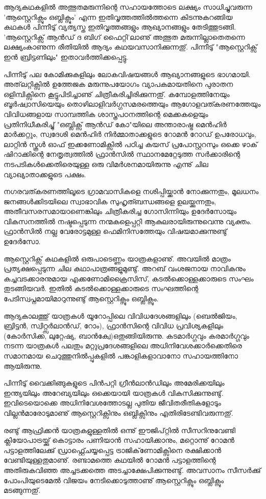 ആദ്യകഥകളില്‍ അത്ഭുതമരുന്നിന്റെ സഹായത്തോടെ ലക്ഷ്യം സാധിച്ചുവരുന്ന 'ആസ്റ്റെറിക്സും ഒബ്ലിക്സും' എന്ന 
ഇതിവൃത്തത്തില്‍ത്തന്നെ കിടന്നുകറങ്ങിയ കഥകള്‍ പിന്നീടു് വ്യത്യസ്ത ഇതിവൃത്തങ്ങളും ആഖ്യാനങ്ങളും തേടിത്തുടങ്ങി. 
'ആസ്റ്റെറിക്സ് ആന്‍ഡ് ദ ബിഗ് ഫൈറ്റി'ലാണു് അത്ഭുത മരുന്നില്ലാതെതന്നെ ലക്ഷ്യംകാണുന്ന രീതിയില്‍ ആദ്യം 
കഥയവസാനിക്കുന്നതു്. പിന്നീടു് "ആസ്റ്റെറിക്സ് ഇന്‍ ബ്രിട്ടണിലും" ഇതാവര്‍ത്തിക്കപ്പെട്ടു.

പിന്നീടു് പല കോമിക്കുകളിലും ലോകവിഷയങ്ങള്‍ ആഖ്യാനങ്ങളുടെ ഭാഗമായി. അത്‌ലറ്റിക്സില്‍ ഉത്തേജക 
മരുന്നുപയോഗം വ്യാപകമായതിനെ പുരാതന ഒളിമ്പിക്സിനെ കൂട്ടുപിടിച്ചാണു് ചിത്രീകരിച്ചിരിക്കുന്നതു്. കമ്പോളത്തിനേയും 
ബൂര്‍ഷ്വാസിയെയും തൊഴിലാളിവര്‍ഗ്ഗസമരത്തെയും ആഗോളവത്കരണത്തേയും വിവിധങ്ങളായ സാമ്പത്തിക 
ശാസ്ത്രപഠനത്തിന്റെ മെക്കകളെയും പ്രതിനിധീകരിച്ചു് "ഒബ്ലിക്സ് ആന്‍ഡ് കോ"യിലെ അന്താരാഷ്ട്ര മെന്‍ഹിര്‍ മാര്‍ക്കറ്റും, 
സ്വദേശി മെന്‍ഹിര്‍ നിര്‍മ്മാതാക്കളുടെ റോമന്‍ റോഡ് ഉപരോധവും, ലാറ്റിന്‍ സ്കൂള്‍ ഓഫ് ഇക്കണോമിക്സില്‍ പഠിച്ച കയസ് 
പ്രപോസ്റ്ററസും ഒക്കെ ഴാക് ഷിറാക്കിന്റെ നേതൃത്വത്തില്‍ ഫ്രാന്‍സില്‍ സ്ഥാനമേറ്റേടുത്ത സര്‍ക്കാരിന്റെ 
നടപടികള്‍ക്കെതിരെയുള്ള ഒരു വിമര്‍ശനമായിരുന്നു എന്നു് ചില വ്യാഖ്യാതാക്കളുടെ പക്ഷം.

നഗരവത്കരണത്തിലൂടെ ഗ്രാമവാസികളെ നശിപ്പിയ്ക്കാന്‍ നോക്കുന്നതും, മൂലധനം ജനങ്ങള്‍ക്കിടയിലെ സ്വാഭാവിക 
സുഹൃത്ബന്ധങ്ങളെ ഉലയ്ക്കുന്നതും, അതീവസരസമായാണെങ്കിലും ചിത്രീകരിച്ച ഗോസിന്നിയും ഉദേര്‍സോയും 
വികസനത്തില്‍ നഷ്ടപ്പെടുന്ന നന്മകളെപ്പറ്റി ആകുലരായിരുന്നുവെന്നു വ്യക്തം. ഫ്രാന്‍സില്‍ നല്ല വേരോട്ടമുള്ള 
ഫെമിനിസത്തേയും വിഷയമാക്കുന്നുണ്ടു് ഉദേര്‍സോ.

ആസ്റ്റെറിക്സ് കഥകളില്‍ ഒരുപാടെണ്ണം യാത്രകളാണു്. അവയില്‍ മാത്രം പ്രത്യക്ഷപ്പെടുന്ന ചില കഥാപാത്രങ്ങളുമുണ്ടു്. 
അറബ് വംശജനായ നാവികനും കച്ചവടക്കാരനുമായ എക്കണോമിക്രൈസിസ്, കടല്‍ക്കൊള്ളക്കാരുടെ സംഘം 
തുടങ്ങിയവര്‍. ഇതില്‍ കടല്‍ക്കൊള്ളക്കാരുടെ സംഘത്തിന്റെ പേടിസ്വപ്നമായിമാറുന്നുണ്ടു് ആസ്റ്റെറിക്സും ഒബ്ലിക്സും.

ആദ്യകാലത്തു് യാത്രകള്‍ യൂറോപ്പിലെ വിവിധദേശങ്ങളിലും (ബെല്‍ജിയം, ബ്രിട്ടന്‍, സ്വിറ്റ്സര്‍ലാന്‍ഡ്, റോം), ഫ്രാന്‍സിന്റെ 
വിവിധ പ്രവിശ്യകളിലും (കോര്‍സിക്ക, ലുറ്റേഷ്യ, ബാന്‍ക്വേ)ഒതുങ്ങിയിരുന്നു. കടമാര്‍ഗ്ഗവും കരമാര്‍ഗ്ഗവും നടന്ന യാത്രകള്‍ പലതും മറ്റുപ്രദേശങ്ങളിലെ 
അധിനിവേശക്കാര്‍ക്കെതിരെ സമാനമായ ചെറുത്തുനില്‍പ്പുകളില്‍ പങ്കാളികളാവാനോ സഹായത്തിനോ ആയിരുന്നു.

പിന്നീടു് വൈക്കിങ്ങുകളുടെ പിന്‍പറ്റി ഗ്രീന്‍ലാന്‍ഡിലും അമേരിക്കയിലും ഇന്ത്യയിലും അറേബ്യയിലും ഒക്കെയായി 
യാത്രകള്‍ വികസിക്കുന്നുണ്ടു്. ഇവിടെയൊക്കെ അധിനിവേശത്തോടല്ല പുതിയ ജീവിതരീതികളോടും 
വില്ലന്‍മാരോടുമാണു് ആസ്റ്റെറിക്സിനും ഒബ്ലിക്സിനും എതിരിടേണ്ടിവരുന്നതു്.

രണ്ടു് ആഫ്രിക്കന്‍ യാത്രകളുള്ളതില്‍ ഒന്നു് ഈജിപ്റ്റില്‍ സീസറിനുവേണ്ടി ക്ലിയോപാട്രയ്ക്കു് കൊട്ടാരം പണിയാന്‍ 
സഹായിക്കാനും, മറ്റൊന്നു് റോമന്‍ പട്ടാളത്തിലേക്കു് ഡ്രാഫ്റ്റ്ചെയ്യപ്പെട്ട ട്രാജിക്‌ണോമിക്സിനെ രക്ഷിക്കാന്‍ 
വേണ്ടിയുള്ളതുമാണു്. രണ്ടാമത്തെ കഥയില്‍ റോമന്‍ പട്ടാളത്തിന്റെ അതിരുകവിഞ്ഞ അച്ചടക്കത്തെ 
അടച്ചാക്ഷേപിക്കുന്നുണ്ടു്. അവസാനം സീസര്‍ക്കു് പോംപിയുടെമേല്‍ വിജയം നേടിക്കൊടുത്താണു് ആസ്റ്റെറിക്സും ഒബ്ലിക്സും 
മടങ്ങുന്നതു്.

